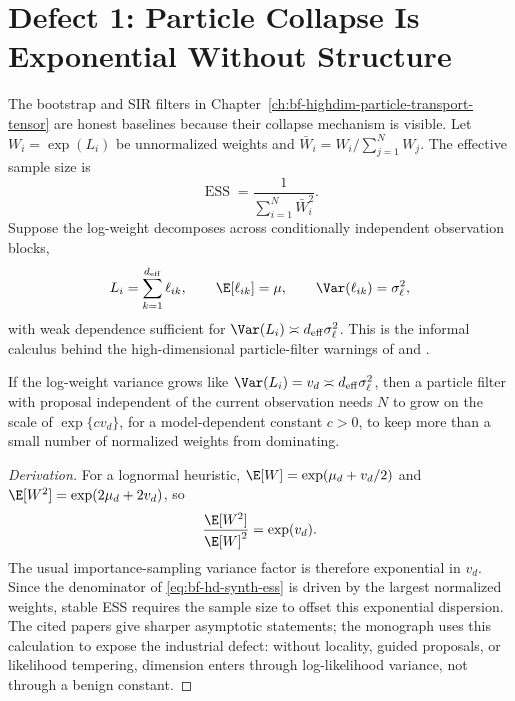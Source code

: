 \section[Particle Collapse]{Defect 1: Particle Collapse Is Exponential Without Structure}
\label{sec:bf-hd-defect-particles}

The bootstrap and SIR filters in Chapter~\ref{ch:bf-highdim-particle-transport-tensor}
are honest baselines because their collapse mechanism is visible.  Let
$W_i=\exp(L_i)$ be unnormalized weights and
$\bar W_i=W_i/\sum_{j=1}^N W_j$.  The effective sample size is
\begin{equation}
  \operatorname{ESS}=\frac{1}{\sum_{i=1}^N \bar W_i^2}.
  \label{eq:bf-hd-synth-ess}
\end{equation}
Suppose the log-weight decomposes across conditionally independent observation
blocks,
\begin{equation}
  L_i=\sum_{k=1}^{d_{\mathrm{eff}}} \ell_{ik},\qquad
  \E[\ell_{ik}]=\mu,\qquad \Var(\ell_{ik})=\sigma_\ell^2,
  \label{eq:bf-hd-synth-logweight}
\end{equation}
with weak dependence sufficient for
\(\Var(L_i)\asymp d_{\mathrm{eff}}\sigma_\ell^2\).  This is the informal
calculus behind the high-dimensional particle-filter warnings of
\citet{bengtsson2008curse} and \citet{snyder2008obstacles}.

\begin{proposition}
\label{prop:bf-hd-particle-collapse-calculus}
If the log-weight variance grows like
\(\Var(L_i)=v_d\asymp d_{\mathrm{eff}}\sigma_\ell^2\), then a particle filter
with proposal independent of the current observation needs \(N\) to grow on the
scale of \(\exp\{c v_d\}\), for a model-dependent constant \(c>0\), to keep
more than a small number of normalized weights from dominating.
\end{proposition}

\begin{proof}[Derivation]
For a lognormal heuristic, \(\E[W]=\exp(\mu_d+v_d/2)\) and
\(\E[W^2]=\exp(2\mu_d+2v_d)\), so
\[
  \frac{\E[W^2]}{\E[W]^2}=\exp(v_d).
\]
The usual importance-sampling variance factor is therefore exponential in
\(v_d\).  Since the denominator of \eqref{eq:bf-hd-synth-ess} is driven by the
largest normalized weights, stable ESS requires the sample size to offset this
exponential dispersion.  The cited papers give sharper asymptotic statements;
the monograph uses this calculation to expose the industrial defect: without
locality, guided proposals, or likelihood tempering, dimension enters through
log-likelihood variance, not through a benign constant.
\end{proof}

